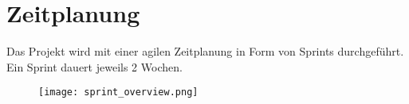 \section{Zeitplanung}
    Das Projekt wird mit einer agilen Zeitplanung in Form von Sprints durchgeführt. Ein Sprint dauert jeweils 2 Wochen.
    \begin{figure}[H]
        \centering
        \texttt{[image: sprint\_overview.png]}
    \end{figure}